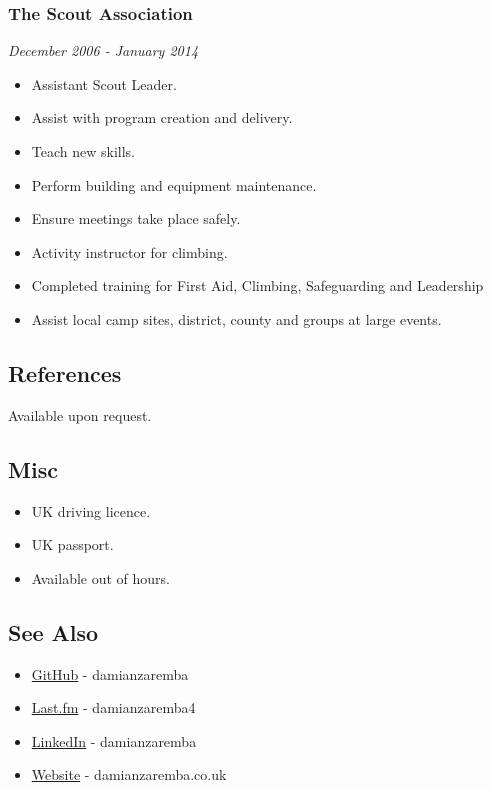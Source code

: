 \subsubsection{The Scout Association}\label{the-scout-association}

\emph{December 2006 - January 2014}

\begin{itemize}
\itemsep1pt\parskip0pt
\item
  Assistant Scout Leader.
\item
  Assist with program creation and delivery.
\item
  Teach new skills.
\item
  Perform building and equipment maintenance.
\item
  Ensure meetings take place safely.
\item
  Activity instructor for climbing.
\item
  Completed training for First Aid, Climbing, Safeguarding and
  Leadership
\item
  Assist local camp sites, district, county and groups at large events.
\end{itemize}

\subsection{References}\label{references}

Available upon request.

\subsection{Misc}\label{misc}

\begin{itemize}
\itemsep1pt\parskip0pt
\item
  UK driving licence.
\item
  UK passport.
\item
  Available out of hours.
\end{itemize}

\subsection{See Also}\label{see-also}

\begin{itemize}
\itemsep1pt\parskip0pt
\item
  \href{https://github.com/damianzaremba}{GitHub} - damianzaremba
\item
  \href{http://last.fm/user/damianzaremba4}{Last.fm} - damianzaremba4
\item
  \href{http://uk.linkedin.com/in/damianzaremba}{LinkedIn} -
  damianzaremba
\item
  \href{http://damianzaremba.co.uk}{Website} - damianzaremba.co.uk
\end{itemize}
